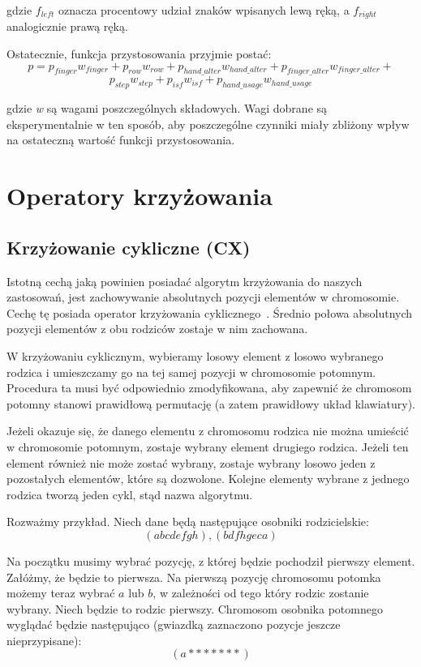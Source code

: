 \documentclass{xmgr}
\begin{document}
gdzie $f_{left}$ oznacza procentowy udział znaków wpisanych lewą ręką, a $f_{right}$ analogicznie prawą ręką.\newline\newline


\noindent Ostatecznie, funkcja przystosowania przyjmie postać:
$$ p = p_{finger} w_{finger} + p_{row} w_{row} + p_{hand\_alter} w_{hand\_alter} + p_{finger\_alter} w_{finger\_alter} + $$
$$ p_{step} w_{step} + p_{isf} w_{isf} + p_{hand\_usage} w_{hand\_usage} $$

\noindent
gdzie \emph{w} są wagami poszczególnych składowych. Wagi dobrane są eksperymentalnie w ten sposób, aby poszczególne czynniki miały zbliżony wpływ na ostateczną wartość funkcji przystosowania.


\section{Operatory krzyżowania}

\subsection{Krzyżowanie cykliczne (CX)}

Istotną cechą jaką powinien posiadać algorytm krzyżowania do naszych zastosowań, jest zachowywanie absolutnych pozycji elementów w chromosomie. Cechę tę posiada operator krzyżowania cyklicznego~\cite{Oliver}. Średnio połowa absolutnych pozycji elementów z obu rodziców zostaje w nim zachowana.

W krzyżowaniu cyklicznym, wybieramy losowy element z losowo wybranego rodzica i umieszczamy go na tej samej pozycji w chromosomie potomnym. Procedura ta musi być odpowiednio zmodyfikowana, aby zapewnić że chromosom potomny stanowi prawidłową permutację (a zatem prawidłowy układ klawiatury).

Jeżeli okazuje się, że danego elementu z chromosomu rodzica nie można umieścić w chromosomie potomnym, zostaje wybrany element drugiego rodzica. Jeżeli ten element również nie może zostać wybrany, zostaje wybrany losowo jeden z pozostałych elementów, które są dozwolone. Kolejne elementy wybrane z jednego rodzica tworzą jeden cykl, stąd nazwa algorytmu.

Rozważmy przykład. Niech dane będą następujące osobniki rodzicielskie:
$$ (a b c d e f g h), (b d f h g e c a) $$

Na początku musimy wybrać pozycję, z której będzie pochodził pierwszy element. Załóżmy, że będzie to pierwsza. Na pierwszą pozycję chromosomu potomka możemy teraz wybrać $a$ lub $b$, w zależności od tego który rodzic zostanie wybrany. Niech będzie to rodzic pierwszy. Chromosom osobnika potomnego wyglądać będzie następująco (gwiazdką zaznaczono pozycje jeszcze nieprzypisane):
$$ (a * * * * * * *) $$
\end{document}

